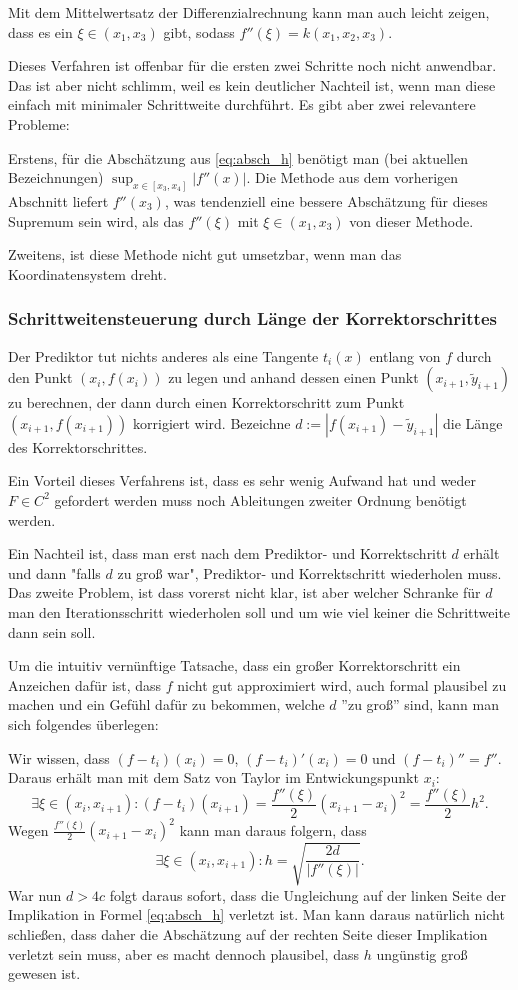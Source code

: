\documentclass[a4paper,11pt,bibliography=totoc,listof=totoc,headinclude=true,cleardoublepage=empty,oneside]{scrartcl}
\newcounter{satz}
\begin{document}
Mit dem Mittelwertsatz der Differenzialrechnung kann man auch leicht zeigen, dass es ein $\xi \in (x_1,x_3)$ gibt, sodass $f''(\xi) = k(x_1,x_2,x_3)$. 

Dieses Verfahren ist offenbar für die ersten zwei Schritte noch nicht anwendbar. Das ist aber nicht schlimm, weil es kein deutlicher Nachteil ist, wenn man diese einfach mit minimaler Schrittweite durchführt. Es gibt aber zwei relevantere Probleme:

Erstens, für die Abschätzung aus \eqref{eq:absch_h} benötigt man (bei aktuellen Bezeichnungen)  $\sup_{x \in [x_3,x_4]} |f''(x)|$. Die Methode aus dem vorherigen Abschnitt liefert $f''(x_3)$, was tendenziell eine bessere Abschätzung für dieses Supremum sein wird, als das $f''(\xi)$ mit $\xi \in (x_1,x_3)$ von dieser Methode.

Zweitens, ist diese Methode nicht gut umsetzbar, wenn man das Koordinatensystem dreht.

\subsubsection{Schrittweitensteuerung durch Länge der Korrektorschrittes}\label{chap:5.1.3}
Der Prediktor tut nichts anderes als eine Tangente $t_i(x)$ entlang von $f$ durch den Punkt $(x_i,f(x_i))$ zu legen und anhand dessen einen Punkt $(x_{i+1},\tilde{y}_{i+1})$ zu berechnen, der dann durch einen Korrektorschritt zum Punkt $(x_{i+1},f(x_{i+1}))$ korrigiert wird. Bezeichne $d:= |f(x_{i+1})-\tilde{y}_{i+1}|$ die Länge des Korrektorschrittes. 

Ein Vorteil dieses Verfahrens ist, dass es sehr wenig Aufwand hat und weder $F \in C^2$ gefordert werden muss noch Ableitungen zweiter Ordnung benötigt werden. 

Ein Nachteil ist, dass man erst nach dem Prediktor- und Korrektschritt $d$ erhält und dann "falls $d$ zu groß war", Prediktor- und Korrektschritt wiederholen muss. Das zweite Problem, ist dass vorerst nicht klar, ist aber welcher Schranke für $d$ man den Iterationsschritt wiederholen soll und um wie viel keiner die Schrittweite dann sein soll.

Um die intuitiv vernünftige Tatsache, dass ein großer Korrektorschritt ein Anzeichen dafür ist, dass $f$ nicht gut approximiert wird, auch formal plausibel zu machen und ein Gefühl dafür zu bekommen, welche $d$ ''zu groß'' sind, kann man sich folgendes überlegen:

Wir wissen, dass $(f-t_i)(x_i)=0$, $(f-t_i)'(x_i)=0$ und $(f-t_i)''=f''$. Daraus erhält man mit dem Satz von Taylor im Entwickungspunkt $x_i$:
\[
\exists \xi \in (x_i,x_{i+1}) : (f-t_i)(x_{i+1}) = \frac{f''(\xi)}{2}(x_{i+1}-x_i)^2 = \frac{f''(\xi)}{2}h^2.
\]
Wegen $\frac{f''(\xi)}{2}(x_{i+1}-x_i)^2$ kann man daraus folgern, dass
\[
\exists \xi \in (x_i,x_{i+1}) : h = \sqrt{\frac{2d}{|f''(\xi)|}}.
\]
War nun $d > 4c$ folgt daraus sofort, dass die Ungleichung auf der linken Seite der Implikation in Formel \eqref{eq:absch_h} verletzt ist. Man kann daraus natürlich nicht schließen, dass daher die Abschätzung auf der rechten Seite dieser Implikation verletzt sein muss, aber es macht dennoch plausibel, dass $h$ ungünstig groß gewesen ist. 
\end{document}
